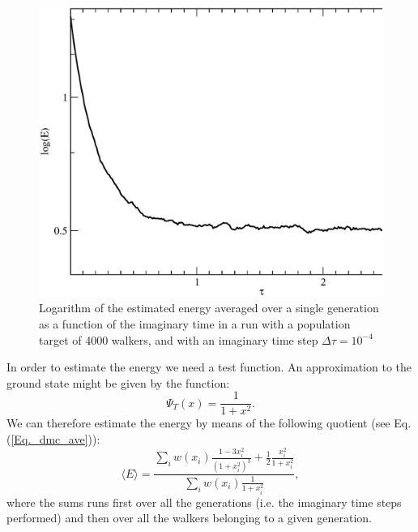 \begin{figure}
	\begin{center}
		\includegraphics[scale=0.5]{Chapter9-figures/dmc_decay.eps}
	\end{center}
	\caption{Logarithm of the estimated energy averaged over a single generation as a function of the imaginary time in a run with a population target of 4000 walkers, and with an imaginary time step $\Delta\tau=10^{-4}$}
	\label{fig.decay}
\end{figure}


In order to estimate the energy we need a test function. An approximation to the ground state might be given by the function:
\begin{equation}
\Psi_T(x)=\frac{1}{1+x^2}.
\end{equation}
We can therefore estimate the energy by means of the following quotient (see Eq. (\ref{Eq._dmc_ave})):
\begin{equation}
\langle E\rangle = \frac{\sum_{i} w(x_i)\frac{1-3x_i^2}{(1+x_i^2)^3}+\frac{1}{2}\frac{x_i^2}{1+x_i^2}}{\sum_iw(x_i)\frac{1}{1+x_i^2}},
\end{equation}
where the sums runs first over all the generations (i.e. the imaginary time steps performed) and then over all the walkers belonging to a given generation.

